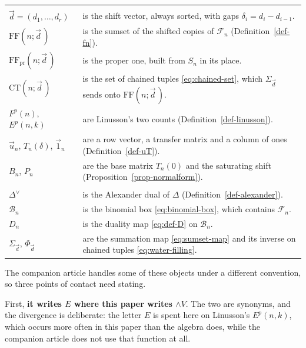 \documentclass[11pt, a4paper, abstract=yes]{scrartcl}
\theoremstyle{definition}
\theoremstyle{remark}
\theoremstyle{plain}
\newcommand{\Ext}{\mathord{\wedge }V}
\begin{document}
\begin{center}
\begin{tabular}{@{}ll@{}}
  \addlinespace
  \multicolumn{2}{@{}l}{\emph{Sumsets and the count}}\\
  \(\vec d=(d_1,\dots,d_r)\) & is the shift vector, always sorted, with gaps \(\delta_i=d_i-d_{i-1}\).\\
  \(\mathrm{FF}(n;\vec d\,)\) & is the sumset of the shifted copies of \(\mathcal F_n\) (Definition~\ref{def-fn}).\\
  \(\mathrm{FF}_{\mathrm{pr}}(n;\vec d\,)\) & is the proper one, built from \(S_n\) in its place.\\
  \(\mathrm{CT}(n;\vec d\,)\)   & is the set of chained tuples \eqref{eq:chained-set}, which \(\Sigma_{\vec d}\) sends onto \(\mathrm{FF}(n;\vec d\,)\).\\
  \(F^p(n)\), \(E^p(n,k)\)  & are Linusson's two counts (Definition~\ref{def-linusson}).\\
  \(\vec u_n\), \(T_n(\delta)\), \(\vec 1_n\) & are a row vector, a transfer matrix and a column of ones (Definition~\ref{def-uT}).\\
  \(B_n\), \(P_n\)          & are the base matrix \(T_n(0)\) and the saturating shift (Proposition~\ref{prop-normalform}).\\
  \addlinespace
  \multicolumn{2}{@{}l}{\emph{Alexander duality}}\\
  \(\Delta^{\vee}\)        & is the Alexander dual of \(\Delta\) (Definition~\ref{def-alexander}).\\
  \(\mathcal B_n\)         & is the binomial box \eqref{eq:binomial-box}, which contains \(\mathcal F_n\).\\
  \(D_n\)                  & is the duality map \eqref{eq:def-D} on \(\mathcal B_n\).\\
  \(\Sigma_{\vec d}\), \(\Phi_{\vec d}\) & are the summation map \eqref{eq:sumset-map} and its inverse on chained tuples \eqref{eq:water-filling}.\\
  \bottomrule
\end{tabular}
\end{center}
\endgroup

The companion article handles some of these objects under a different convention, so three points of
contact need stating.

First, \textbf{it writes \(E\) where this paper writes \(\Ext\)}. The two are synonyms, and the divergence
is deliberate: the letter \(E\) is spent here on Linusson's \(E^p(n,k)\), which occurs more often in
this paper than the algebra does, while the companion article does not use that function at all.
\end{document}
